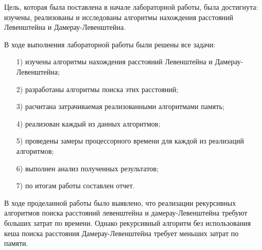 Цель, которая была поставлена в начале лабораторной работы, была достигнута: изучены, реализованы и исследованы
алгоритмы нахождения расстояний Левенштейна и Дамерау-Левенштейна.

В ходе выполнения лабораторной работы были решены все задачи:
\begin{enumerate}
	\item[1)] изучены алгоритмы нахождения расстояний Левенштейна и Дамерау-Левенштейна;
	\item[2)] разработаны алгоритмы поиска этих расстояний;
	\item[3)] расчитана затрачиваемая реализованными алгоритмами память;
	\item[4)] реализован каждый из данных алгоритмов;
	\item[5)] проведены замеры процессорного времени для каждой из реализаций алгоритмов;
	\item[6)] выполнен анализ полученных результатов;
	\item[7)] по итогам работы составлен отчет.
\end{enumerate}

В ходе проделанной работы было выявлено, что реализации рекурсивных алгоритмов поиска расстояний левенштейна и дамерау-Левенштейна требуют больших затрат по времени. Однако рекурсивный алгоритм без использования кеша поиска расстояния Дамерау-Левенштейна требует меньших затрат по памяти. 